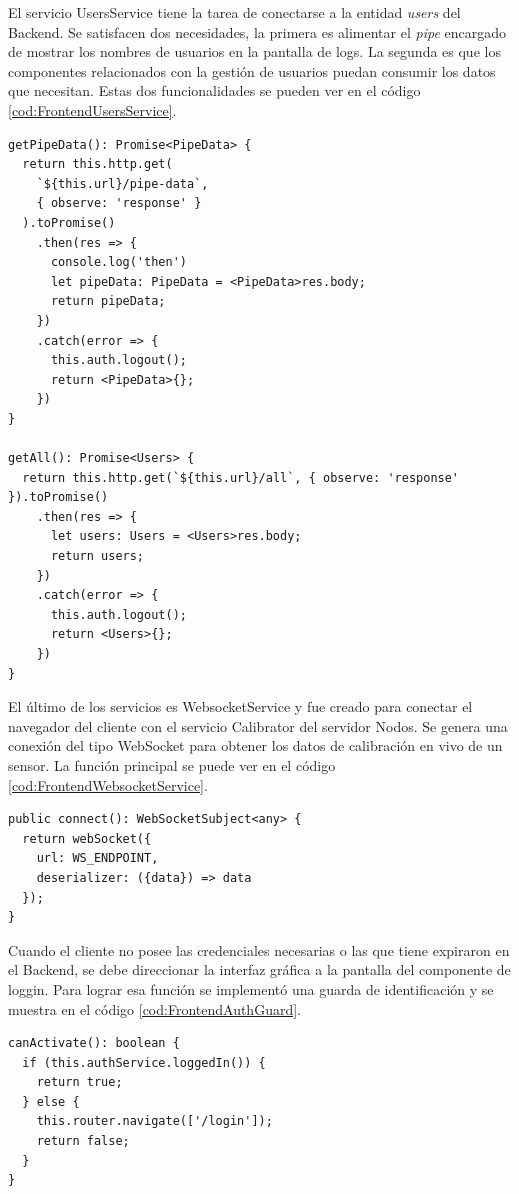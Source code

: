 El servicio UsersService tiene la tarea de conectarse a la entidad \emph{users} del Backend.
Se satisfacen dos necesidades, la primera es alimentar el \emph{pipe} encargado de mostrar los nombres de usuarios en la pantalla de logs.
La segunda es que los componentes relacionados con la gestión de usuarios puedan consumir los datos que necesitan.
Estas dos funcionalidades se pueden ver en el código \ref{cod:FrontendUsersService}. 


\begin{lstlisting}[label=cod:FrontendUsersService,caption=Funciones de UsersService]
getPipeData(): Promise<PipeData> {
  return this.http.get(
    `${this.url}/pipe-data`,
    { observe: 'response' }
  ).toPromise()
    .then(res => {
      console.log('then')
      let pipeData: PipeData = <PipeData>res.body;
      return pipeData;
    })
    .catch(error => {
      this.auth.logout();
      return <PipeData>{};
    })
}

getAll(): Promise<Users> {
  return this.http.get(`${this.url}/all`, { observe: 'response' }).toPromise()
    .then(res => {
      let users: Users = <Users>res.body;
      return users;
    })
    .catch(error => {
      this.auth.logout();
      return <Users>{};
    })
}
\end{lstlisting}

El último de los servicios es WebsocketService y fue creado para conectar el navegador del cliente con el servicio Calibrator del servidor Nodos.
Se genera una conexión del tipo WebSocket para obtener los datos de calibración en vivo de un sensor.
La función principal se puede ver en el código \ref{cod:FrontendWebsocketService}.

\newpage

\begin{lstlisting}[label=cod:FrontendWebsocketService,caption=Función principal de WebsocketService]
public connect(): WebSocketSubject<any> {
  return webSocket({
    url: WS_ENDPOINT,
    deserializer: ({data}) => data
  });
}
\end{lstlisting}

Cuando el cliente no posee las credenciales necesarias o las que tiene expiraron en el Backend, se debe direccionar la interfaz gráfica a la pantalla del componente de loggin.
Para lograr esa función se implementó una guarda de identificación y se muestra en el código \ref{cod:FrontendAuthGuard}.

\begin{lstlisting}[label=cod:FrontendAuthGuard,caption=Función de guarda de identificación]
canActivate(): boolean {
  if (this.authService.loggedIn()) {
    return true;
  } else {
    this.router.navigate(['/login']);
    return false;
  }
}
\end{lstlisting}

